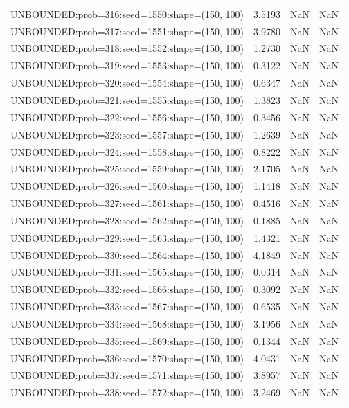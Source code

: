 \begin{longtable}{lccc}
UNBOUNDED:prob=316:seed=1550:shape=(150, 100) &  3.5193 &   NaN &    NaN \\
UNBOUNDED:prob=317:seed=1551:shape=(150, 100) &  3.9780 &   NaN &    NaN \\
UNBOUNDED:prob=318:seed=1552:shape=(150, 100) &  1.2730 &   NaN &    NaN \\
UNBOUNDED:prob=319:seed=1553:shape=(150, 100) &  0.3122 &   NaN &    NaN \\
UNBOUNDED:prob=320:seed=1554:shape=(150, 100) &  0.6347 &   NaN &    NaN \\
UNBOUNDED:prob=321:seed=1555:shape=(150, 100) &  1.3823 &   NaN &    NaN \\
UNBOUNDED:prob=322:seed=1556:shape=(150, 100) &  0.3456 &   NaN &    NaN \\
UNBOUNDED:prob=323:seed=1557:shape=(150, 100) &  1.2639 &   NaN &    NaN \\
UNBOUNDED:prob=324:seed=1558:shape=(150, 100) &  0.8222 &   NaN &    NaN \\
UNBOUNDED:prob=325:seed=1559:shape=(150, 100) &  2.1705 &   NaN &    NaN \\
UNBOUNDED:prob=326:seed=1560:shape=(150, 100) &  1.1418 &   NaN &    NaN \\
UNBOUNDED:prob=327:seed=1561:shape=(150, 100) &  0.4516 &   NaN &    NaN \\
UNBOUNDED:prob=328:seed=1562:shape=(150, 100) &  0.1885 &   NaN &    NaN \\
UNBOUNDED:prob=329:seed=1563:shape=(150, 100) &  1.4321 &   NaN &    NaN \\
UNBOUNDED:prob=330:seed=1564:shape=(150, 100) &  4.1849 &   NaN &    NaN \\
UNBOUNDED:prob=331:seed=1565:shape=(150, 100) &  0.0314 &   NaN &    NaN \\
UNBOUNDED:prob=332:seed=1566:shape=(150, 100) &  0.3092 &   NaN &    NaN \\
UNBOUNDED:prob=333:seed=1567:shape=(150, 100) &  0.6535 &   NaN &    NaN \\
UNBOUNDED:prob=334:seed=1568:shape=(150, 100) &  3.1956 &   NaN &    NaN \\
UNBOUNDED:prob=335:seed=1569:shape=(150, 100) &  0.1344 &   NaN &    NaN \\
UNBOUNDED:prob=336:seed=1570:shape=(150, 100) &  4.0431 &   NaN &    NaN \\
UNBOUNDED:prob=337:seed=1571:shape=(150, 100) &  3.8957 &   NaN &    NaN \\
UNBOUNDED:prob=338:seed=1572:shape=(150, 100) &  3.2469 &   NaN &    NaN \\

\end{longtable}
